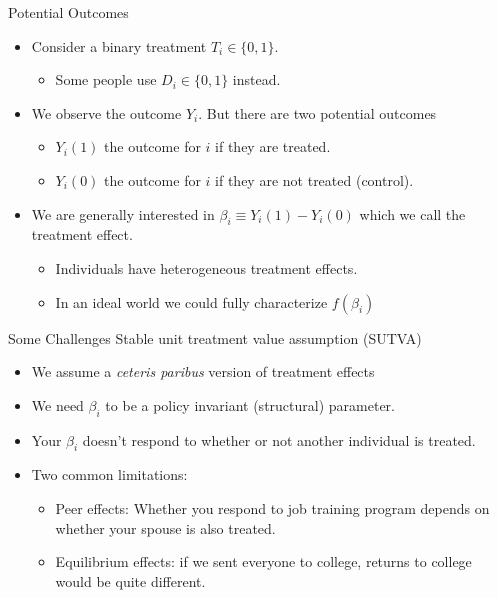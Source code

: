 \documentclass[xcolor=pdftex,dvipsnames,table,mathserif,aspectratio=169]{beamer}
\begin{document}
\begin{frame}{Potential Outcomes}
\begin{itemize}
\item Consider a binary treatment $T_i \in \{0,1\}$. 
\begin{itemize}
\item Some people use $D_i \in \{0,1\}$ instead.
\end{itemize}
\item We observe the outcome $Y_i$. But there are two \alert{potential outcomes}
\begin{itemize}
\item $Y_i(1)$ the outcome for $i$ if they  \alert{are treated}.
\item $Y_i(0)$ the outcome for $i$ if they \alert{are not treated} (control).
\end{itemize}
\item We are generally interested in $\beta_i \equiv  Y_i(1)-Y_i(0)$ which we call the \alert{treatment effect}.
\begin{itemize}
\item Individuals have \alert{heterogeneous treatment effects}.
\item In an ideal world we could fully characterize $f(\beta_i)$
\end{itemize}
\end{itemize}
\end{frame}

\begin{frame}{Some Challenges}
Stable unit treatment value assumption (SUTVA)
\begin{itemize}
\item We assume a \textit{ceteris paribus} version of treatment effects
\item We need $\beta_i$ to be a policy invariant (structural) parameter.
\item Your $\beta_i$ doesn't respond to whether or not another individual is treated.
\item Two common limitations:
\begin{itemize}
\item Peer effects: Whether you respond to job training program depends on whether your spouse is also treated.
\item Equilibrium effects: if we sent everyone to college, returns to college would be quite different.
\end{itemize}
\end{itemize}
\end{frame}
\end{document}
